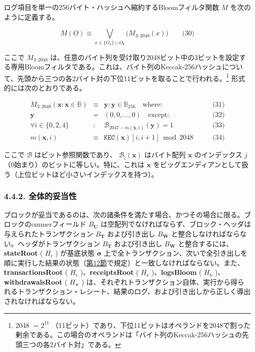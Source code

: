 \documentclass[
]{ltjsarticle}
\begin{document}
ログ項目を単一の256バイト・ハッシュへ縮約するBloomフィルタ関数 \(M\)
を次のように定義する。

\protect\hypertarget{eq-30}{}{}

\[M(O) \equiv \bigvee_{x \in \{O_{\mathrm{a}}\} \cup O_{\mathbf{t}}} \big( M_{3:2048}(x) \big) \qquad \text{(30)}\]

ここで \(M_{3:2048}\)
は、任意のバイト列を受け取り2048ビット中の3ビットを設定する専用Bloomフィルタである。これは、バイト列のKeccak-256ハッシュについて、先頭から三つの各2バイト対の下位11ビットを取ることで行われる。\footnote{2048
  \(= 2^{11}\)
  （11ビット）であり、下位11ビットはオペランドを2048で割った剰余である。この場合のオペランドは「バイト列のKeccak-256ハッシュの先頭三つの各2バイト対」である。}
形式的には次のとおりである。

\protect\hypertarget{eq-31}{}{}\protect\hypertarget{eq-32}{}{}\protect\hypertarget{eq-33}{}{}\protect\hypertarget{eq-34}{}{}

\[\begin{aligned}
M_{3:2048}(\mathbf{x}: \mathbf{x} \in \mathbb{B}) & \equiv & \mathbf{y}: \mathbf{y} \in \mathbb{B}_{256} \quad \text{where:} & \qquad \text{(31)} \\
\mathbf{y} & = & (0, 0, ..., 0) \quad \text{except:} & \qquad \text{(32)} \\
\forall i \in \{0, 2, 4\}&:&\mathcal{B}_{2047 - m(\mathbf{x}, i)}(\mathbf{y}) = 1 & \qquad \text{(33)} \\
m(\mathbf{x}, i) &\equiv& \mathtt{KEC}(\mathbf{x})[i, i + 1] \bmod 2048 & \qquad \text{(34)}
\end{aligned}\]

ここで \(\mathcal{B}\) はビット参照関数であり、
\(\mathcal{B}_{\mathrm{j}}(\mathbf{x})\) はバイト配列 \(\mathbf{x}\)
のインデックス \(j\) （0始まり）のビットに等しい。特に、これは
\(\mathbf{x}\)
をビッグエンディアンとして扱う（上位ビットほど小さいインデックスを持つ）。

\hypertarget{ux5168ux4f53ux7684ux59a5ux5f53ux6027}{%
\subsubsection{4.4.2.
全体的妥当性}\label{ux5168ux4f53ux7684ux59a5ux5f53ux6027}}

ブロックが妥当であるのは、次の諸条件を満たす場合、かつその場合に限る。ブロックのommerフィールド
\(B_{\mathbf{U}}\)
は空配列でなければならず、ブロック・ヘッダは与えられたトランザクション
\(B_{\mathbf{T}}\) および引き出し \(B_{\mathbf{W}}\)
と整合しなければならない。ヘッダがトランザクション \(B_{\mathbf{T}}\)
および引き出し \(B_{\mathbf{W}}\) と整合するには、\textbf{stateRoot} (
\(H_{\mathrm{r}}\) ) が基底状態 \(\boldsymbol{\sigma}\)
上で全トランザクション、次いで全引き出しを順に実行した結果の状態（\protect\hyperlink{ch:finalisation}{第12節}で規定）と一致しなければならない。また、\textbf{transactionsRoot}
( \(H_{\mathrm{t}}\) )、\textbf{receiptsRoot} ( \(H_{\mathrm{e}}\)
)、\textbf{logsBloom} ( \(H_{\mathrm{b}}\) )、\textbf{withdrawalsRoot} (
\(H_{\mathrm{w}}\) )
は、それぞれトランザクション自体、実行から得られるトランザクション・レシート、結果のログ、および引き出しから正しく導出されなければならない。
\end{document}
